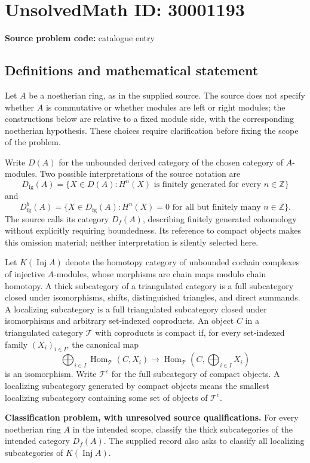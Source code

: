 \documentclass[11pt]{article}
\newcommand{\Z}{\mathbb{Z}}
\begin{document}
\section*{UnsolvedMath ID: 30001193}
\textbf{Source problem code:} catalogue entry
\subsection{Definitions and mathematical statement}
Let \(A\) be a noetherian ring, as in the supplied source. The source does not specify whether \(A\) is commutative or whether modules are left or right modules; the constructions below are relative to a fixed module side, with the corresponding noetherian hypothesis. These choices require clarification before fixing the scope of the problem.

Write \(D(A)\) for the unbounded derived category of the chosen category of \(A\)-modules. Two possible interpretations of the source notation are
\[
D_{\mathrm{fg}}(A)=\{X\in D(A):H^n(X)\text{ is finitely generated for every }n\in\Z\}
\]
and
\[
D^b_{\mathrm{fg}}(A)=\{X\in D_{\mathrm{fg}}(A):H^n(X)=0\text{ for all but finitely many }n\in\Z\}.
\]
The source calls its category \(D_f(A)\), describing finitely generated cohomology without explicitly requiring boundedness. Its reference to compact objects makes this omission material; neither interpretation is silently selected here.

Let \(K(\operatorname{Inj}A)\) denote the homotopy category of unbounded cochain complexes of injective \(A\)-modules, whose morphisms are chain maps modulo chain homotopy. A thick subcategory of a triangulated category is a full subcategory closed under isomorphisms, shifts, distinguished triangles, and direct summands. A localizing subcategory is a full triangulated subcategory closed under isomorphisms and arbitrary set-indexed coproducts. An object \(C\) in a triangulated category \(\mathcal T\) with coproducts is compact if, for every set-indexed family \((X_i)_{i\in I}\), the canonical map
\[
\bigoplus_{i\in I}\operatorname{Hom}_{\mathcal T}(C,X_i)
\longrightarrow
\operatorname{Hom}_{\mathcal T}\!\left(C,\bigoplus_{i\in I}X_i\right)
\]
is an isomorphism. Write \(\mathcal T^c\) for the full subcategory of compact objects. A localizing subcategory generated by compact objects means the smallest localizing subcategory containing some set of objects of \(\mathcal T^c\).

\textbf{Classification problem, with unresolved source qualifications.} For every noetherian ring \(A\) in the intended scope, classify the thick subcategories of the intended category \(D_f(A)\). The supplied record also asks to classify all localizing subcategories of \(K(\operatorname{Inj}A)\).
\end{document}
